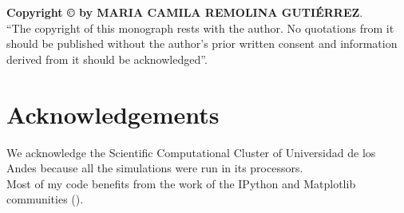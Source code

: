 \vspace{4in}
\noindent \textbf{Copyright \copyright{} by MARIA CAMILA REMOLINA GUTI\'ERREZ}.\\
``The copyright of this monograph rests with the author.  No quotations
from it should be published without the author's prior written consent
and information derived from it should be acknowledged''.

\chapter*{Acknowledgements}
We acknowledge the Scientific Computational Cluster of Universidad de los Andes because all the simulations were run in its processors.\\

Most of my code benefits from the work of the IPython and Matplotlib communities (\cite{IPython,matplotlib}).\\

\tableofcontents
\clearpage